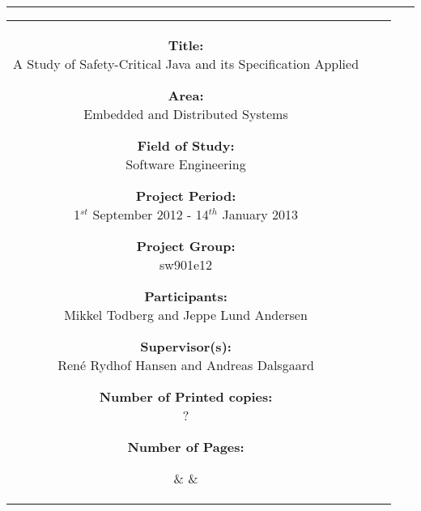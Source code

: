 \begin{titlepage}

\begin{center}
\begin{tabular}{c}
\end{tabular}
\end{center}
\vspace{-3mm}
\hrule

\vspace{5mm}

\hspace{-10mm}
\begin{tabular}{ccc}

\parbox{45mm}{
  \footnotesize
  \begin{description}
  
  \item{\textbf{Title:}          \\ A Study of Safety-Critical Java and its Specification Applied}
  \item{\textbf{Area:}           \\ Embedded and Distributed Systems}
  \item{\textbf{Field of Study:} \\ Software Engineering}
  \item{\textbf{Project Period:} \\ 1$^{st}$ September 2012 - 14$^{th}$ January 2013}
  \item{\textbf{Project Group:}  \\ sw901e12}
  \item{\textbf{Participants:}   \\ Mikkel Todberg and Jeppe Lund Andersen}
  \item{\textbf{Supervisor(s):}  \\ Ren\'{e} Rydhof Hansen and Andreas Dalsgaard}

  \item{\textbf{Number of Printed copies:} \\ ?}
  \item{\textbf{Number of Pages:} \\ \pageref{LastPage}}

  \end{description}
}

&
\hspace{5mm}
&

\fbox{
  \parbox{65mm}{
    \footnotesize
    
  }
}

\end{tabular}

\end{titlepage}
